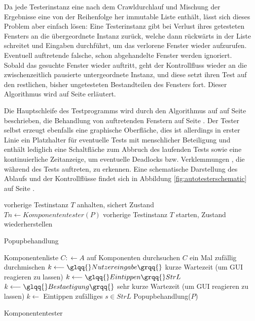 Da jede Testerinstanz
eine nach dem Crawldurchlauf und Mischung der Ergebnisse eine von 
der Reihenfolge her immutable Liste enthält, lässt sich dieses Problem aber
einfach lösen: Eine Testerinstanz gibt bei Verlust ihres getesteten Fensters
an die übergeordnete Instanz zurück, welche dann rückwärts in der Liste
schreitet und Eingaben durchführt, um das verlorene Fenster wieder aufzurufen.
Eventuell auftretende falsche, schon abgehandelte Fenster werden ignoriert.
Sobald das gesuchte Fenster wieder auftritt, geht der Kontrollfluss wieder an
die zwischenzeitlich pausierte untergeordnete Instanz, und diese setzt ihren
Test auf den restlichen, bisher ungetesteten Bestandteilen des Fensters fort.
Dieser Algorithmus wird auf Seite \pageref{alg:autotesterwindowloss} erläutert.

Die Hauptschleife des Testprogramms wird durch den Algorithmus auf auf Seite 
\pageref{alg:autotestermain} beschrieben, die Behandlung von auftretenden
Fenstern auf Seite \pageref{alg:autotesterpopup}. Der Tester selbst erzeugt
ebenfalls eine graphische Oberfläche, dies ist allerdings in erster Linie
ein Platzhalter für eventuelle Tests mit menschlicher Beteiligung und enthält
lediglich eine Schaltfläche zum Abbruch des laufenden Tests sowie eine
kontinuierliche Zeitanzeige, um eventuelle Deadlocks bzw. Verklemmungen \cite{deadlocks},
die während des Tests auftreten, zu erkennen. Eine schematische Darstellung
des Ablaufs und der Kontrollflüsse findet sich in Abbildung 
\ref{fig:autotesterschematic} auf Seite \pageref{fig:autotesterschematic}.


\begin{algorithm} \SetAlgoLined
	vorherige Testinstanz $T$ anhalten, sichert Zustand\;
	$Tn \longleftarrow Komponententester(P)$\;
	vorherige Testinstanz $T$ starten, Zustand wiederherstellen\;
	\caption{Popupbehandlung}
	\label{alg:autotesterpopup}
\end{algorithm}

\begin{algorithm} \SetAlgoLined
	Komponentenliste $C: \longleftarrow A$ auf Komponenten durchsuchen\;
	$C$ ein Mal zufällig durchmischen\;
	{
		{
			$k \longleftarrow \glqq{}Nutzereingabe\grqq{}$\;
			kurze Wartezeit (um GUI reagieren zu lassen)
		}
		{
			{
				$k \longleftarrow \glqq{}Eintippen\grqq{} StrL$\;
				$k \longleftarrow \glqq{}Bestaetigung\grqq{}$\;
				sehr kurze Wartezeit (um GUI reagieren zu lassen)
			}
			$k \longleftarrow$ \glqq{}Eintippen\grqq{} zufälliges $s \in StrL$\;
		}
		{
			Popupbehandlung($P$)\;
		}
	}
	\caption{Komponententester}
	\label{alg:autotestermain}
\end{algorithm}

